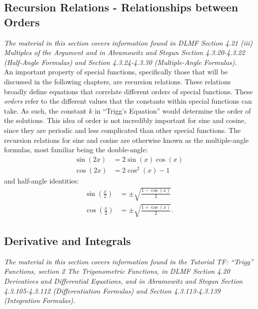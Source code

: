 \documentclass[11pt]{report}
\begin{document}
\subsection{Recursion Relations - Relationships between Orders}

\emph{The material in this section covers information found in DLMF Section 4.21 (iii) Multiples of the Argument and in Abramowitz and Stegun Section 4.3.20-4.3.22 (Half-Angle Formulas) and Section 4.3.24-4.3.30 (Multiple-Angle Formulas).}\\

An important property of special functions, specifically those that will be discussed in the following chapters, are recursion relations. These relations broadly define equations that correlate different orders of special functions. These \emph{orders} refer to the different values that the constants within special functions can take. As such, the constant $k$ in ``Trigg's Equation'' would determine the order of the solutions. This idea of order is not incredibly important for sine and cosine, since they are periodic and less complicated than other special functions. The recursion relations for sine and cosine are otherwise known as the multiple-angle formulas, most familiar being the double-angle: 
    \begin{align}
        \sin{(2x)}&=2\sin{(x)}\cos{(x)}\\
        \cos{(2x)}&=2\cos^2{(x)}-1
    \end{align}
and half-angle identities:
    \begin{align}
        \sin{\left(\frac{x}{2}\right)}&=\pm\sqrt{\frac{1-\cos{(x)}}{2}}\\
        \cos{\left(\frac{x}{2}\right)}&=\pm\sqrt{\frac{1+\cos{(x)}}{2}}.
    \end{align}
    
    
    
\subsection{Derivative and Integrals}

\emph{The material in this section covers information found in the Tutorial TF: “Trigg” Functions, section 2 The Trigonometric Functions, in DLMF Section 4.20 Derivatives and Differential Equations, and in Abramowitz and Stegun Section 4.3.105-4.3.112 (Differentiation Formulas) and Section 4.3.113-4.3.139 (Integration Formulas).}\\
\end{document}
